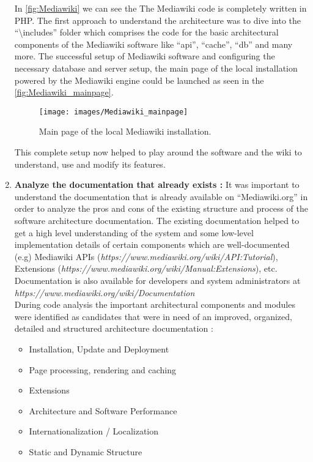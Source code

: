\begin{enumerate}
In \autoref{fig:Mediawiki}  we can see the The Mediawiki code is completely written in PHP. The first approach to understand the architecture was to dive into the \enquote{\textbackslash{includes}} folder which comprises the code for the basic architectural components of the Mediawiki software like \enquote{api}, \enquote{cache}, \enquote{db} and many more. 
\indent 
\indent The successful setup of Mediawiki software and configuring the necessary database and server setup, the main page of the local installation powered by the Mediawiki engine could be launched as seen in the \autoref{fig:Mediawiki_mainpage}.
\begin{figure}[H]
  \centering
  \texttt{[image: images/Mediawiki\_mainpage]}
  \caption[Main page of the local Mediawiki installation]{Main page of the local Mediawiki installation.}\label{fig:Mediawiki_mainpage}
\end{figure}
This complete setup now helped to play around the software and the wiki to understand, use and modify its features.
\item \textbf{Analyze the documentation that already exists : } It was important to understand the documentation that is already available on \enquote{Mediawiki.org} in order to analyze the pros and cons of the existing structure and process of the software architecture documentation. The existing documentation helped to get a high level understanding of the system and some low-level implementation details of certain components which are well-documented (e.g) Mediawiki APIs (\emph{https://www.mediawiki.org/wiki/API:Tutorial}), Extensions (\emph{https://www.mediawiki.org/wiki/Manual:Extensions}), etc. Documentation is also available for developers and system administrators at
\emph{https://www.mediawiki.org/wiki/Documentation}
\\\indent  During code analysis the important architectural components and modules were identified as candidates that were in need of an improved, organized, detailed and structured architecture documentation :
\begin{itemize}
\item Installation, Update and Deployment
\item Page processing, rendering and caching
\item Extensions
\item Architecture and Software Performance
\item Internationalization / Localization
\item Static and Dynamic Structure

\end{itemize}
\end{enumerate}
